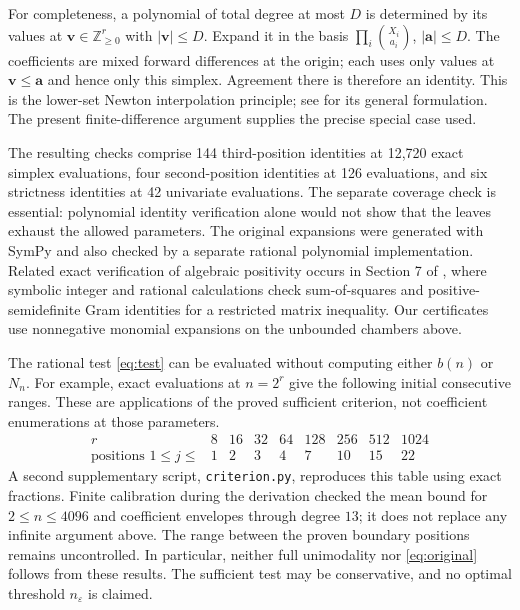 \documentclass[11pt]{article}
\begin{document}
For completeness, a polynomial of total degree at most $D$ is determined
by its values at $\boldsymbol v\in\mathbb Z_{\ge0}^r$ with
$|\boldsymbol v|\le D$. Expand it in the basis
$\prod_i\binom{X_i}{a_i}$, $|\boldsymbol a|\le D$.
The coefficients are mixed forward differences at the origin; each uses
only values at $\boldsymbol v\le\boldsymbol a$ and hence only this simplex.
Agreement there is therefore an identity. This is the lower-set Newton
interpolation principle; see \cite{Neidinger} for its general formulation.
The present finite-difference argument supplies the precise special case used.

The resulting checks comprise 144 third-position identities at 12,720
exact simplex evaluations, four second-position identities at 126 evaluations,
and six strictness identities at 42 univariate evaluations. The separate
coverage check is essential: polynomial identity verification alone would
not show that the leaves exhaust the allowed parameters.
The original expansions were generated with SymPy \cite{SymPy} and also
checked by a separate rational polynomial implementation.
Related exact verification of algebraic positivity occurs in
Section 7 of \cite{ZengChollet}, where symbolic integer and rational
calculations check sum-of-squares and positive-semidefinite Gram identities
for a restricted matrix inequality. Our certificates use nonnegative monomial
expansions on the unbounded chambers above.

The rational test \eqref{eq:test} can be evaluated without computing either
$b(n)$ or $N_n$. For example, exact evaluations at $n=2^r$ give the following
initial consecutive ranges. These are applications of the proved sufficient
criterion, not coefficient enumerations at those parameters.
\[
\begin{array}{c|rrrrrrrr}
 r&8&16&32&64&128&256&512&1024\\\hline
 \text{positions }1\le j\le&1&2&3&4&7&10&15&22
\end{array}
\]
A second supplementary script, \texttt{criterion.py}, reproduces this table
using exact fractions. Finite calibration during the derivation checked the
mean bound for $2\le n\le4096$ and coefficient envelopes through degree
$13$; it does not replace any infinite argument above.
The range between the proven boundary positions remains uncontrolled.
In particular, neither full unimodality nor \eqref{eq:original} follows from
these results. The sufficient test may be conservative, and no optimal
threshold $n_\varepsilon$ is claimed.
\end{document}
